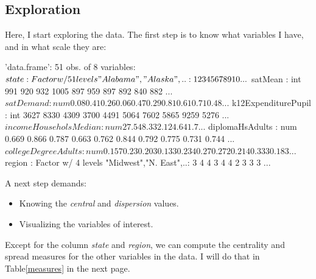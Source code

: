 \documentclass[11pt]{article}
\begin{document}
\subsection{Exploration}\label{eda}

Here, I start exploring the data. The first step is to know what variables I have, and in what scale they are:


\begin{Schunk}
\begin{Soutput}
'data.frame':	51 obs. of  8 variables:
 $ state                : Factor w/ 51 levels "Alabama","Alaska",..: 1 2 3 4 5 6 7 8 9 10 ...
 $ satMean              : int  991 920 932 1005 897 959 897 892 840 882 ...
 $ satDemand            : num  0.08 0.41 0.26 0.06 0.47 0.29 0.81 0.61 0.71 0.48 ...
 $ k12ExpenditurePupil  : int  3627 8330 4309 3700 4491 5064 7602 5865 9259 5276 ...
 $ incomeHouseholsMedian: num  27.5 48.3 32.1 24.6 41.7 ...
 $ diplomaHsAdults      : num  0.669 0.866 0.787 0.663 0.762 0.844 0.792 0.775 0.731 0.744 ...
 $ collegeDegreeAdults  : num  0.157 0.23 0.203 0.133 0.234 0.27 0.272 0.214 0.333 0.183 ...
 $ region               : Factor w/ 4 levels "Midwest","N. East",..: 3 4 4 3 4 4 2 3 3 3 ...
\end{Soutput}
\end{Schunk}


A next step demands:
\begin{itemize}
  \item Knowing the \emph{central} and \emph{dispersion} values.
  \item Visualizing the variables of interest.
\end{itemize}

Except for the column \emph{state} and \emph{region}, we can compute the centrality and spread measures for the other variables in the data. I will do that in Table\ref{measures} in the next page.

\clearpage  

\end{document}
